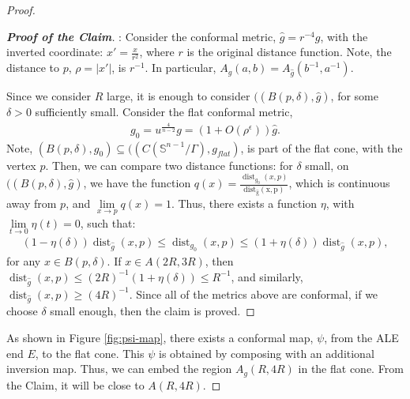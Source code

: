 \documentclass[12pt]{amsart}
\theoremstyle{definition}
\begin{document}
\begin{proof}
    \begin{proof}[\textbf{Proof of the Claim}]: Consider the conformal metric, $\hat{g} = r^{-4} g$, with the inverted coordinate: $x' = \frac{x}{r^2}$, where $r$ is the original distance function. Note, the distance to $p$, $\rho = |x'|$, is $r^{-1}$. In particular, $A_g(a,b) = A_{\hat{g}}(b^{-1}, a^{-1})$. 

        Since we consider $R$ large, it is enough to consider $((B(p,\delta), \hat{g})$, for some $\delta>0$ sufficiently small. Consider the flat conformal metric, 
        \begin{align*}
            g_0 = u^{\frac{4}{n-2}} g = (1+O(\rho^\epsilon))\hat{g}.
        \end{align*}
        Note, $(B(p,\delta), g_0)\subseteq ((C(\mathbb{S}^{n-1}/\Gamma), g_{flat})$, is part of the flat cone, with the vertex $p$. Then, we can compare two distance functions: for $\delta$ small, on $((B(p,\delta), \hat{g})$, we have the function $q(x) = \frac{\operatorname{dist}_{g_0}(x,p)}{\operatorname{dist_{\hat{g}}(x,p)}}$, which is continuous away from $p$, and $\lim\limits_{x\to p}q(x)=1$. Thus, there exists a function $\eta$, with $\lim\limits_{t\to0}\eta(t) = 0$, such that:
        \begin{align*}
            (1-\eta(\delta))\operatorname{dist}_{\hat{g}}(x,p)\leq\operatorname{dist}_{g_0}(x,p)\leq(1+\eta(\delta))\operatorname{dist}_{\hat{g}}(x,p),
        \end{align*}
        for any $x\in B(p,\delta)$. If $x\in A(2R,3R)$, then $\operatorname{dist}_{\hat{g}}(x,p) \leq (2R)^{-1}(1+\eta(\delta)) \leq R^{-1}$, and similarly, $\operatorname{dist}_{\hat{g}}(x,p) \geq (4R)^{-1}$. Since all of the metrics above are conformal, if we choose $\delta$ small enough, then the claim is proved.

        \end{proof}

        As shown in Figure \ref{fig:psi-map}, there exists a conformal map, $\psi$, from the ALE end $E$, to the flat cone. This $\psi$ is obtained by composing with an additional inversion map. Thus, we can embed the region $A_g(R,4R)$ in the flat cone. From the Claim, it will be close to $A(R,4R)$.

    


\end{proof}
\end{document}
